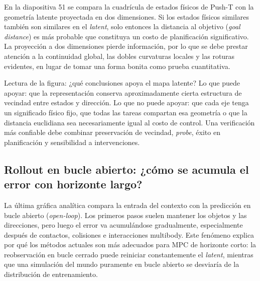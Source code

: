 En la diapositiva 51 se compara la cuadrícula de estados físicos de Push-T con la geometría latente proyectada en dos dimensiones. Si los estados físicos similares también son similares en el \textit{latent}, solo entonces la distancia al objetivo (\textit{goal distance}) es más probable que constituya un costo de planificación significativo. La proyección a dos dimensiones pierde información, por lo que se debe prestar atención a la continuidad global, las dobles curvaturas locales y las roturas evidentes, en lugar de tomar una forma bonita como prueba cuantitativa.


\begin{knowledgebox}{Lectura de la figura: ¿qué conclusiones apoya el mapa latente?}
Lo que puede apoyar: que la representación conserva aproximadamente cierta estructura de vecindad entre estados y dirección. Lo que no puede apoyar: que cada eje tenga un significado físico fijo, que todas las tareas compartan esa geometría o que la distancia euclidiana sea necesariamente igual al costo de control. Una verificación más confiable debe combinar preservación de vecindad, \textit{probe}, éxito en planificación y sensibilidad a intervenciones.
\end{knowledgebox}

\subsection{Rollout en bucle abierto: ¿cómo se acumula el error con horizonte largo?}

La última gráfica analítica compara la entrada del contexto con la predicción en bucle abierto (\textit{open-loop}). Los primeros pasos suelen mantener los objetos y las direcciones, pero luego el error va acumulándose gradualmente, especialmente después de contactos, colisiones e interacciones multibody. Este fenómeno explica por qué los métodos actuales son más adecuados para MPC de horizonte corto: la reobservación en bucle cerrado puede reiniciar constantemente el \textit{latent}, mientras que una simulación del mundo puramente en bucle abierto se desviaría de la distribución de entrenamiento.


